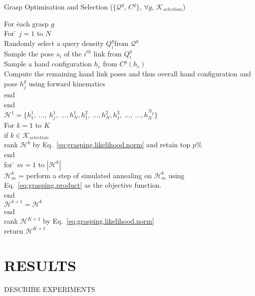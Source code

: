 \documentclass[a4paper, 10pt, conference]{ieeeconf}      %
\newcommand{\eq}{Eq.~}
\newcommand{\hc}{C}
\newcommand{\qd}{Q}
\begin{document}
\begin{figure*}
Grasp Optimisation and Selection ($\{ \mathcal{Q}^g${,} $\hc^g \}${,} $\forall g${,} $\mathcal{K}_{selection}$)
\begin{minipage}{\linewidth}\begin{tabbing}%
For \= each grasp $g$ \\
	\> For \= $j=1$ to $N$\\
	\> \> Randomly select a query density $\qd_i^g$from $\mathcal{Q}^g$\\
	\> \> Sample the pose $s_i$ of the $i^{th}$ link from $\qd_i^g$\\
	\> \> Sample a hand configuration $h_c$ from $\hc^g(h_c)$\\
	\> \> Compute the remaining hand link poses and thus overall hand configuration and pose $h^g_j$ using forward kinematics\\
	\> end\\
end \\
$\mathcal{H}^1 = \{h^{1}_1,\ \ldots,\ h^{1}_j,\ \ldots, h^{1}_N, h^{2}_1,\ \ldots, h^{2}_N, h^{3}_1,\ \ldots,\ \ldots, h^{N_g}_N\}$ \\
For $k = 1$ to $K$ \\
\> if $k \in \mathcal{K}_{selection}$ \\
\> \> rank $\mathcal{H}^k$ by \eq\ref{eq:grasping.likelihood.norm} and retain top $p\%$ \\
\> end\\
\> for \= $m = 1$ to $|\mathcal{H}^k|$ \\
\> \> $\mathcal{H}^k_m$ = perform a step of simulated annealing on $\mathcal{H}^{k}_m$ using \eq\ref{eq:grasping.product} as the objective function.\\
\> end \\
\> $\mathcal{H}^{k+1} = \mathcal{H}^{k}$ \\
end \\
rank $\mathcal{H}^{K+1}$ by \eq\ref{eq:grasping.likelihood.norm} \\
return $\mathcal{H}^{K+1}$ \\
\end{tabbing}\end{minipage}%
\end{figure*}

\section{RESULTS}

DESCRIBE EXPERIMENTS
\end{document}
